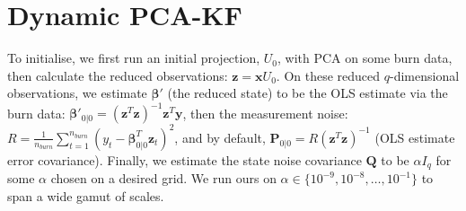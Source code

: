 \section{Dynamic PCA-KF}\label{sec:dynamicfk}
To initialise, we first run an initial projection, $U_0$, with PCA on some burn data, then calculate the reduced observations: $\bm{z}=\bm{x}U_0$. On these reduced $q$-dimensional observations, we estimate $\bm{\beta}'$ (the reduced state) to be the OLS estimate via the burn data: $\bm{\beta}'_{0|0}=(\bm{z}^T\bm{z})^{-1}\bm{z}^T \bm{y}$, then the measurement noise: $R = \frac{1}{n_{burn}}\sum_{t=1}^{n_{burn}}(y_t-\bm{\beta}_{0|0}^T \bm{z}_t)^2$, and by default, $\bm{P}_{0|0} = R(\bm{z}^T \bm{z})^{-1}$ (OLS estimate error covariance). Finally, we estimate the state noise covariance $\bm{Q}$ to be $\alpha I_q$ for some $\alpha$ chosen on a desired grid. We run ours on $\alpha\in \{10^{-9}, 10^{-8}, \dots, 10^{-1}\}$ to span a wide gamut of scales.

